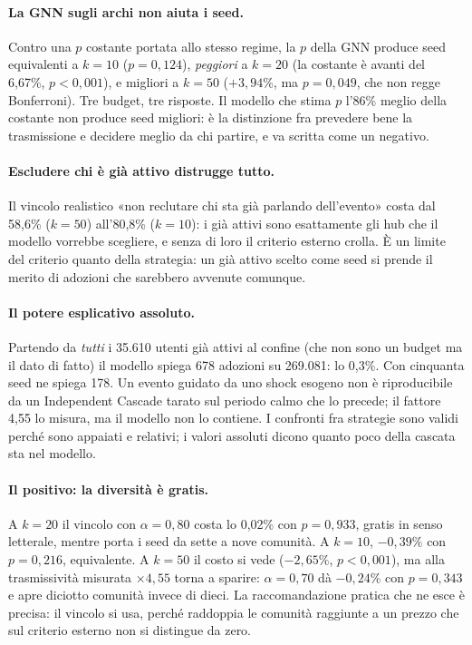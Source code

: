 \documentclass[11pt,a4paper]{article}
\begin{document}
\paragraph{La GNN sugli archi non aiuta i seed.} Contro una $p$ costante portata allo stesso regime, la $p$ della GNN produce seed equivalenti a $k = 10$ ($p = 0{,}124$), \emph{peggiori} a $k = 20$ (la costante è avanti del 6,67\%, $p < 0{,}001$), e migliori a $k = 50$ ($+3{,}94\%$, ma $p = 0{,}049$, che non regge Bonferroni). Tre budget, tre risposte. Il modello che stima $p$ l'86\% meglio della costante non produce seed migliori: è la distinzione fra prevedere bene la trasmissione e decidere meglio da chi partire, e va scritta come un negativo.

\paragraph{Escludere chi è già attivo distrugge tutto.} Il vincolo realistico «non reclutare chi sta già parlando dell'evento» costa dal 58,6\% ($k = 50$) all'80,8\% ($k = 10$): i già attivi sono esattamente gli hub che il modello vorrebbe scegliere, e senza di loro il criterio esterno crolla. È un limite del criterio quanto della strategia: un già attivo scelto come seed si prende il merito di adozioni che sarebbero avvenute comunque.

\paragraph{Il potere esplicativo assoluto.} Partendo da \emph{tutti} i 35.610 utenti già attivi al confine (che non sono un budget ma il dato di fatto) il modello spiega 678 adozioni su 269.081: lo 0,3\%. Con cinquanta seed ne spiega 178. Un evento guidato da uno shock esogeno non è riproducibile da un Independent Cascade tarato sul periodo calmo che lo precede; il fattore 4,55 lo misura, ma il modello non lo contiene. I confronti fra strategie sono validi perché sono appaiati e relativi; i valori assoluti dicono quanto poco della cascata sta nel modello.

\paragraph{Il positivo: la diversità è gratis.} A $k = 20$ il vincolo con $\alpha = 0{,}80$ costa lo 0,02\% con $p = 0{,}933$, gratis in senso letterale, mentre porta i seed da sette a nove comunità. A $k = 10$, $-0{,}39\%$ con $p = 0{,}216$, equivalente. A $k = 50$ il costo si vede ($-2{,}65\%$, $p < 0{,}001$), ma alla trasmissività misurata $\times 4{,}55$ torna a sparire: $\alpha = 0{,}70$ dà $-0{,}24\%$ con $p = 0{,}343$ e apre diciotto comunità invece di dieci. La raccomandazione pratica che ne esce è precisa: il vincolo si usa, perché raddoppia le comunità raggiunte a un prezzo che sul criterio esterno non si distingue da zero.
\end{document}
